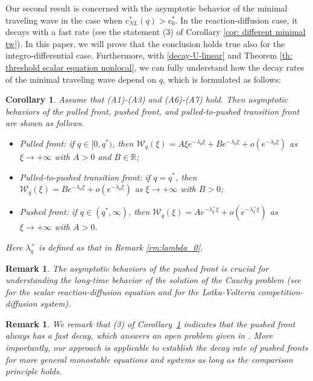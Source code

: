 \documentclass[11pt,a4paper]{article}
\newtheorem{corollary}[theorem]{\textbf{Corollary}}
\newtheorem{remark}[theorem]{\textbf{Remark}}
\numberwithin{equation}{section}
\numberwithin{figure}{section}
\begin{document}
Our second result is concerned with the asymptotic behavior of the minimal traveling wave in the case when
$c_{NL}^*(q)>c^*_0$. In the reaction-diffusion case, it decays with a fast rate (see the statement (3) of Corollary \ref{cor: different minimal tw}). In this paper, we will prove that the conclusion holds true also for the integro-differential case. Furthermore, with \eqref{decay-U-linear} and Theorem \ref{th: threshold scalar equation nonlocal},
we can fully understand how the decay rates of the minimal traveling wave depend on $q$, which is formulated as follows:
\begin{corollary}\label{cor: different minimal tw nonlocal}
Assume that (A1)-(A3) and (A6)-(A7) hold. Then asymptotic behaviors of the pulled front, pushed front, and pulled-to-pushed transition front are shown as follows.
\begin{itemize}
    \item[(1)] Pulled front: if $q\in[0,q^*)$, then $\mathcal{W}_q(\xi)=A\xi e^{-\lambda_0\xi}+Be^{-\lambda_0\xi}+o(e^{-\lambda_0\xi})$ as $\xi\to+\infty$ with $A>0$ and $B\in \mathbb{R}$;
    \item[(2)] Pulled-to-pushed transition front: if $q=q^*$, then $\mathcal{W}_q(\xi)=Be^{-\lambda_0\xi}+o(e^{-\lambda_0\xi})$ as $\xi\to+\infty$ with $B>0$;
    \item[(3)] Pushed front: if $q\in(q^*,\infty)$, then $\mathcal{W}_q(\xi)=Ae^{-\lambda^+_q\xi}+o(e^{-\lambda^+_q\xi})$ as $\xi\to+\infty$ with $A>0$.%
\end{itemize}
Here $\lambda^+_{q}$ is defined as that in Remark \ref{rm:lambda_0}.
\end{corollary}

\begin{remark}\label{rm: asy of minimal tw nonlinear case}
The asymptotic behaviors of the pushed front is crucial for understanding the long-time behavior of the solution of the Cauchy problem (see \cite{Rothe1981} for the scalar reaction-diffusion equation and \cite{Wu Xiao Zhou} for the Lotka-Volterra competition-diffusion system). 
\end{remark}

\begin{remark}\label{rm: solved an open}
We remark that (3) of Corollary~\ref{cor: different minimal tw nonlocal} indicates that the pushed front always has a fast decay, which answers an open problem given in \cite{Bonnefon Coville Garnier Roques2014}. 
More importantly, our approach is applicable to establish the decay rate of pushed fronts for more general monostable equations and systems as long as the comparison principle holds.
\end{remark}
\end{document}
